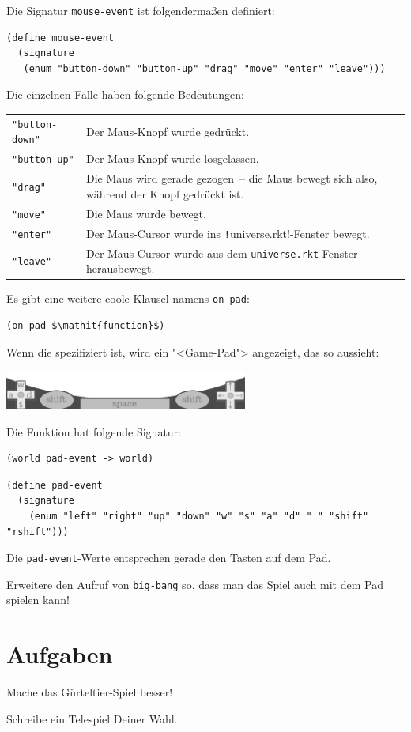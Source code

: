 Die Signatur \lstinline{mouse-event} ist folgendermaßen definiert:
%
\begin{lstlisting}
(define mouse-event
  (signature
   (enum "button-down" "button-up" "drag" "move" "enter" "leave")))
\end{lstlisting}
%
Die einzelnen Fälle haben folgende Bedeutungen:
%
\begin{center}
  \begin{tabular}{lp{4in}}
  \lstinline!"button-down"! & Der Maus-Knopf wurde gedrückt.\\
  \lstinline!"button-up"! & Der Maus-Knopf wurde losgelassen.\\
  \lstinline!"drag"! & Die Maus wird gerade gezogen~-- die Maus bewegt
  sich also, während der Knopf gedrückt ist.\\
  \lstinline!"move"! & Die Maus wurde bewegt.\\
  \lstinline!"enter"! & Der Maus-Cursor wurde ins
  \texttt!universe.rkt!-Fenster bewegt.\\
  \lstinline!"leave"! & Der Maus-Cursor wurde aus dem
                        \texttt{universe.rkt}-Fenster herausbewegt.
  \end{tabular}
\end{center}
%
Es gibt eine weitere coole Klausel namens \lstinline{on-pad}:
%
\begin{lstlisting}
(on-pad $\mathit{function}$)
\end{lstlisting}
%
Wenn die spezifiziert ist, wird ein "<Game-Pad"> angezeigt, das so
aussieht:
%
\begin{center}
  \includegraphics[width=0.6\textwidth]{i1world/gamepad}
\end{center}
%
Die Funktion hat folgende Signatur:
%
\begin{lstlisting}
(world pad-event -> world)
\end{lstlisting}
%
\begin{lstlisting}
(define pad-event
  (signature
    (enum "left" "right" "up" "down" "w" "s" "a" "d" " " "shift" "rshift")))
\end{lstlisting}
%
Die \lstinline{pad-event}-Werte entsprechen gerade den Tasten auf dem Pad.

\begin{aufgabeinline}
  Erweitere den Aufruf von \lstinline{big-bang} so, dass man das Spiel
  auch mit dem Pad spielen kann!
\end{aufgabeinline}

\section*{Aufgaben}

\begin{aufgabe}
  Mache das Gürteltier-Spiel besser!
\end{aufgabe}

\begin{aufgabe}
  Schreibe ein Telespiel Deiner Wahl.
\end{aufgabe}


